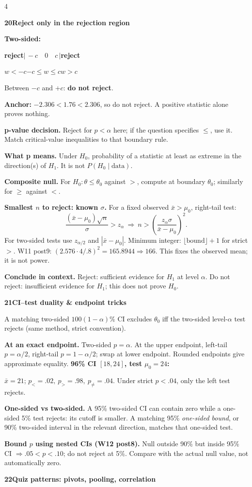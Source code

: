 \documentclass[a4paper,landscape]{article}
\newcommand{\head}[2][late]{\par\vspace{3pt}\noindent\colorbox{#1}{\parbox{\dimexpr\linewidth-6pt}{\color{white}\bfseries #2}}\par\vspace{1pt}}
\newcommand{\cue}[1]{\par\textbf{#1}\enspace}
\newcommand{\xb}{\bar x}
\newcommand{\col}{\par\vfill\columnbreak}
\begin{document}
\begin{multicols*}{4}
\head{20\quad Reject only in the rejection region}
\textbf{Two-sided:}\par
\centerline{\textbf{reject}\quad\(\big|\,-c\quad0\quad c\,\big|\)\quad\textbf{reject}}
\centerline{\(w<-c\)\hfill\(-c\le w\le c\)\hfill\(w>c\)}
Between \(-c\) and \(+c\): \textbf{do not reject}.\par
\textbf{Anchor:} \(-2.306<1.76<2.306\), so do not reject. A positive statistic alone proves nothing.
\cue{p-value decision.} Reject for \(p<\alpha\) here; if the question specifies \(\le\), use it. Match critical-value inequalities to that boundary rule.
\cue{What p means.} Under \(H_0\), probability of a statistic at least as extreme in the direction(s) of \(H_1\). It is not \(P(H_0\mid\text{data})\).
\cue{Composite null.} For \(H_0:\theta\le\theta_0\) against \(>\), compute at boundary \(\theta_0\); similarly for \(\ge\) against \(<\).
\cue{Smallest \(n\) to reject: known \(\sigma\).} For a fixed observed \(\xb>\mu_0\), right-tail test:
\[\frac{(\xb-\mu_0)\sqrt n}{\sigma}>z_\alpha
\ \Rightarrow\ n>\left(\frac{z_\alpha\sigma}{\xb-\mu_0}\right)^2.\]
For two-sided tests use \(z_{\alpha/2}\) and \(|\xb-\mu_0|\). Minimum integer: \(\lfloor\text{bound}\rfloor+1\) for strict \(>\). W11 post9: \((2.576\cdot4/.8)^2=165.8944\Rightarrow166\). This fixes the observed mean; it is not power.
\cue{Conclude in context.} Reject: sufficient evidence for \(H_1\) at level \(\alpha\). Do not reject: insufficient evidence for \(H_1\); this does not prove \(H_0\).
\head{21\quad CI--test duality \& endpoint tricks}
A matching two-sided \(100(1-\alpha)\%\) CI excludes \(\theta_0\) iff the two-sided level-\(\alpha\) test rejects (same method, strict convention).
\cue{At an exact endpoint.} Two-sided \(p=\alpha\). At the upper endpoint, left-tail \(p=\alpha/2\), right-tail \(p=1-\alpha/2\); swap at lower endpoint. Rounded endpoints give approximate equality.
\textbf{96\% CI \([18,24]\), test \(\mu_0=24\):}\par
\(\xb=21\); \(p_<=.02,\ p_>=.98,\ p_{\ne}=.04\). Under strict \(p<.04\), only the left test rejects.
\cue{One-sided vs two-sided.} A 95\% two-sided CI can contain zero while a one-sided 5\% test rejects: its cutoff is smaller. A matching 95\% \emph{one-sided bound}, or 90\% two-sided interval in the relevant direction, matches that one-sided test.
\cue{Bound \(p\) using nested CIs (W12 post8).} Null outside 90\% but inside 95\% CI \(\Rightarrow .05<p<.10\); do not reject at 5\%. Compare with the actual null value, not automatically zero.
\col
\head{22\quad Quiz patterns: pivots, pooling, correlation}

\end{multicols*}
\end{document}

